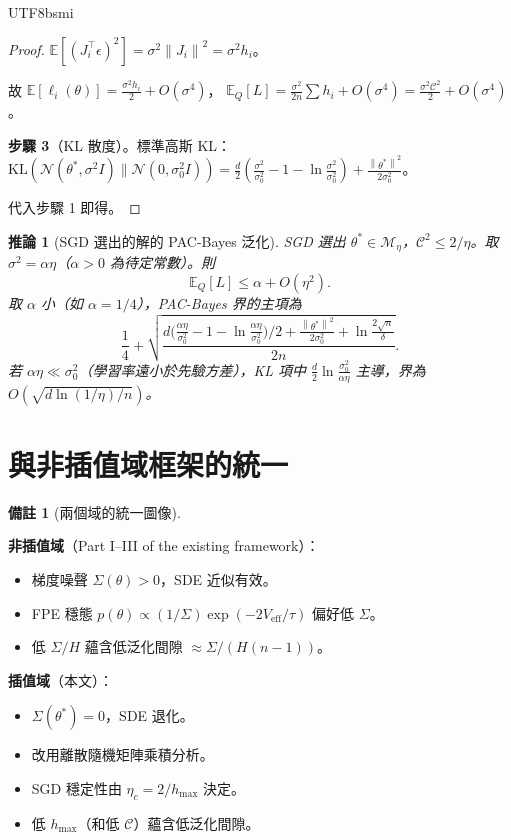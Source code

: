 \documentclass[11pt,a4paper]{article}
\newtheorem{corollary}[theorem]{推論}
\theoremstyle{definition}
\newtheorem{remark}[theorem]{備註}
\newcommand{\E}{\mathbb{E}}
\newcommand{\cM}{\mathcal{M}}
\newcommand{\cC}{\mathcal{C}}
\newcommand{\norm}[1]{\left\|#1\right\|}
\begin{document}
\begin{CJK}{UTF8}{bsmi}
\begin{proof}
  $\E[(J_i^\top\epsilon)^2]=\sigma^2\norm{J_i}^2=\sigma^2 h_i$。

  故 $\E[\ell_i(\theta)]=\frac{\sigma^2 h_i}{2}+O(\sigma^4)$，
  $\E_Q[L]=\frac{\sigma^2}{2n}\sum h_i+O(\sigma^4)=\frac{\sigma^2\cC^2}{2}+O(\sigma^4)$。

  \textbf{步驟 3}（KL 散度）。標準高斯 KL：
  $\mathrm{KL}(\mathcal{N}(\theta^*,\sigma^2 I)\|\mathcal{N}(0,\sigma_0^2 I))
  =\frac{d}{2}\!\left(\frac{\sigma^2}{\sigma_0^2}-1-\ln\frac{\sigma^2}{\sigma_0^2}\right)+\frac{\norm{\theta^*}^2}{2\sigma_0^2}$。

  代入步驟 1 即得。
\end{proof}

\begin{corollary}[SGD 選出的解的 PAC-Bayes 泛化]\label{cor:pb}
  SGD 選出 $\theta^*\in\cM_\eta$，$\cC^2\leq 2/\eta$。取 $\sigma^2=\alpha\eta$（$\alpha>0$ 為待定常數）。則
  \[
    \E_Q[L]\leq\alpha+O(\eta^2).
  \]
  取 $\alpha$ 小（如 $\alpha=1/4$），PAC-Bayes 界的主項為
  \[
    \frac{1}{4}+\sqrt{\frac{d\bigl(\frac{\alpha\eta}{\sigma_0^2}-1-\ln\frac{\alpha\eta}{\sigma_0^2}\bigr)/2+\frac{\norm{\theta^*}^2}{2\sigma_0^2}+\ln\frac{2\sqrt{n}}{\delta}}{2n}}.
  \]
  若 $\alpha\eta\ll\sigma_0^2$（學習率遠小於先驗方差），KL 項中 $\frac{d}{2}\ln\frac{\sigma_0^2}{\alpha\eta}$ 主導，界為 $O(\sqrt{d\ln(1/\eta)/n})$。
\end{corollary}

\section{與非插值域框架的統一}

\begin{remark}[兩個域的統一圖像]
  \

  \textbf{非插值域}（Part I--III of the existing framework）：
  \begin{itemize}
    \item 梯度噪聲 $\Sigma(\theta)>0$，SDE 近似有效。
    \item FPE 穩態 $p(\theta)\propto(1/\Sigma)\exp(-2V_{\mathrm{eff}}/\tau)$ 偏好低 $\Sigma$。
    \item 低 $\Sigma/H$ 蘊含低泛化間隙 $\approx\Sigma/(H(n-1))$。
  \end{itemize}

  \textbf{插值域}（本文）：
  \begin{itemize}
    \item $\Sigma(\theta^*)=0$，SDE 退化。
    \item 改用離散隨機矩陣乘積分析。
    \item SGD 穩定性由 $\eta_c=2/h_{\max}$ 決定。
    \item 低 $h_{\max}$（和低 $\cC$）蘊含低泛化間隙。
  \end{itemize}


\end{remark}
\end{CJK}
\end{document}
